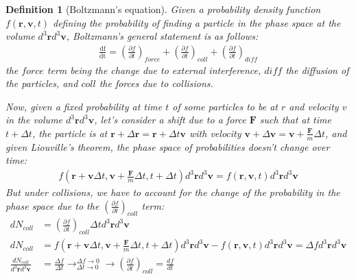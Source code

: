 \documentclass[12pt]{article}
\newtheorem{definition}{Definition}
\begin{document}
\begin{definition}[Boltzmann's equation]
    Given a probability density function $f(\mathbf{r}, \mathbf{v}, t)$ defining the probability of finding a particle in the phase space at the volume $d^3\mathbf{r}d^3\mathbf{v}$, Boltzmann's general statement is as follows:
    \begin{align*}
        \frac{\mathrm{df}}{\mathrm{dt}} = \left( \frac{\partial f}{\partial t} \right)_{force} + \left( \frac{\partial f}{\partial t} \right)_{coll}+ \left( \frac{\partial f}{\partial t} \right)_{diff}
    \end{align*}
    the $force$ term being the change due to external interference, $diff$ the diffusion of the particles, and $coll$ the forces due to collisions.

    Now, given a fixed probability at time $t$ of some particles to be at $r$ and velocity $v$ in the volume $d^3\mathbf{r}d^3\mathbf{v}$, let's consider a shift due to a force $\mathbf{F}$ such that at time $t + \Delta t$, the particle is at $\mathbf{r} + \Delta \mathbf{r}= \mathbf{r} + \Delta t \mathbf{v}$ with velocity $\mathbf{v} + \Delta \mathbf{v} = \mathbf{v} + \frac{\mathbf{F}}{m} \Delta t$, and given Liouville's theorem, the phase space of probabilities doesn't change over time:
    \begin{align*}
        f\left(\mathbf{r} + \mathbf{v} \Delta t, \mathbf{v} + \frac{\mathbf{F}}{m} \Delta t, t + \Delta t\right) d^3\mathbf{r} d^3 \mathbf{v} = f(\mathbf{r}, \mathbf{v}, t) d^3\mathbf{r} d^3 \mathbf{v}
    \end{align*}
    But under collisions, we have to account for the change of the probability in the phase space due to the $\left( \frac{\partial f}{\partial t} \right)_{coll}$ term:
    \begin{align*}
        dN_{coll} &= \left( \frac{\partial f}{\partial t} \right)_{coll} \Delta t d^3\mathbf{r} d^3 \mathbf{v} \\
        dN_{coll} &=  f\left(\mathbf{r} + \mathbf{v} \Delta t, \mathbf{v} + \frac{\mathbf{F}}{m} \Delta t, t + \Delta t\right) d^3\mathbf{r} d^3 \mathbf{v} - f(\mathbf{r}, \mathbf{v}, t) d^3\mathbf{r} d^3 \mathbf{v} = \Delta f d^3\mathbf{r} d^3\mathbf{v} \\
        \frac{dN_{coll}}{d^3\mathbf{r}d^3\mathbf{v}} &= \frac{\Delta f}{\Delta t} \to^{\Delta f \to 0}_{\Delta t \to 0} \to \left(\frac{\partial f}{\partial t} \right)_{coll} = \frac{df}{dt}
    \end{align*}


\end{definition}
\end{document}
